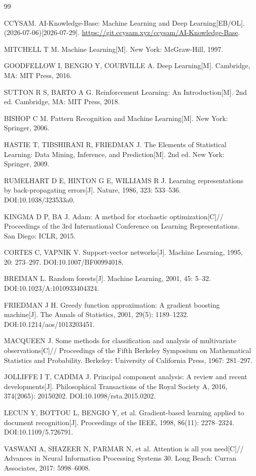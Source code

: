 \documentclass[UTF8,zihao=-4,a4paper,fontset=windows]{ctexart}
\begin{document}
\clearpage
\small
\raggedright
\begin{thebibliography}{99}

CCYSAM.
AI-Knowledge-Base: Machine Learning and Deep Learning[EB/OL].
(2026-07-06)[2026-07-29].
\url{https://git.ccysam.xyz/ccysam/AI-Knowledge-Base}.

MITCHELL T M.
Machine Learning[M].
New York: McGraw-Hill, 1997.

GOODFELLOW I, BENGIO Y, COURVILLE A.
Deep Learning[M].
Cambridge, MA: MIT Press, 2016.

SUTTON R S, BARTO A G.
Reinforcement Learning: An Introduction[M].
2nd ed.
Cambridge, MA: MIT Press, 2018.

BISHOP C M.
Pattern Recognition and Machine Learning[M].
New York: Springer, 2006.

HASTIE T, TIBSHIRANI R, FRIEDMAN J.
The Elements of Statistical Learning: Data Mining, Inference, and Prediction[M].
2nd ed.
New York: Springer, 2009.

RUMELHART D E, HINTON G E, WILLIAMS R J.
Learning representations by back-propagating errors[J].
Nature, 1986, 323: 533--536.
DOI:10.1038/323533a0.

KINGMA D P, BA J.
Adam: A method for stochastic optimization[C]//
Proceedings of the 3rd International Conference on Learning Representations.
San Diego: ICLR, 2015.

CORTES C, VAPNIK V.
Support-vector networks[J].
Machine Learning, 1995, 20: 273--297.
DOI:10.1007/BF00994018.

BREIMAN L.
Random forests[J].
Machine Learning, 2001, 45: 5--32.
DOI:10.1023/A:1010933404324.

FRIEDMAN J H.
Greedy function approximation: A gradient boosting machine[J].
The Annals of Statistics, 2001, 29(5): 1189--1232.
DOI:10.1214/aos/1013203451.

MACQUEEN J.
Some methods for classification and analysis of multivariate observations[C]//
Proceedings of the Fifth Berkeley Symposium on Mathematical Statistics and Probability.
Berkeley: University of California Press, 1967: 281--297.

JOLLIFFE I T, CADIMA J.
Principal component analysis: A review and recent developments[J].
Philosophical Transactions of the Royal Society A, 2016, 374(2065): 20150202.
DOI:10.1098/rsta.2015.0202.

LECUN Y, BOTTOU L, BENGIO Y, et al.
Gradient-based learning applied to document recognition[J].
Proceedings of the IEEE, 1998, 86(11): 2278--2324.
DOI:10.1109/5.726791.

VASWANI A, SHAZEER N, PARMAR N, et al.
Attention is all you need[C]//
Advances in Neural Information Processing Systems 30.
Long Beach: Curran Associates, 2017: 5998--6008.

\end{thebibliography}
\normalsize
\end{document}
